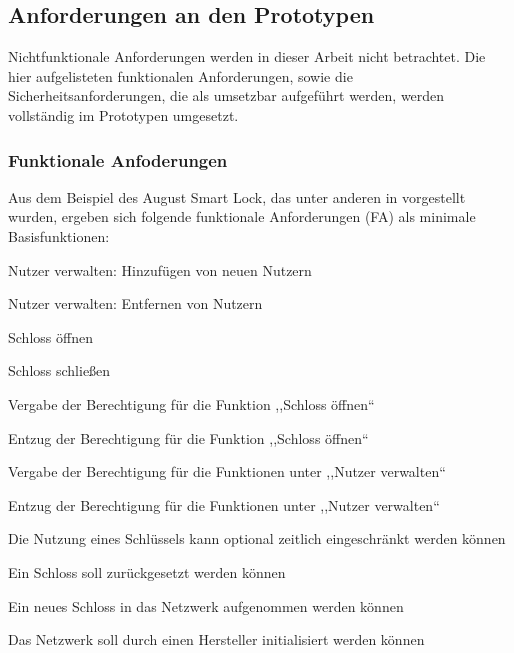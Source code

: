 \subsection{Anforderungen an den Prototypen}
\label{sec:prototype_requirements}
    Nichtfunktionale Anforderungen werden in dieser Arbeit nicht betrachtet. 
    Die hier aufgelisteten funktionalen Anforderungen, sowie die Sicherheitsanforderungen, die als umsetzbar aufgeführt werden, werden vollständig im Prototypen umgesetzt. 
    
\subsubsection{Funktionale Anfoderungen}
\label{sec:prototype_func_req}
    Aus dem Beispiel des August Smart Lock, das unter anderen in  vorgestellt wurden, ergeben sich folgende funktionale Anforderungen (FA) als minimale Basisfunktionen:
    \begin{FA}[noitemsep]
        \item \label{fa:1}Nutzer verwalten: Hinzufügen von neuen Nutzern
        \item \label{fa:2}Nutzer verwalten: Entfernen von Nutzern
        \item \label{fa:3}Schloss öffnen
        \item \label{fa:4}Schloss schließen
        \item \label{fa:5}Vergabe der Berechtigung für die Funktion ,,Schloss öffnen``
        \item \label{fa:6}Entzug der Berechtigung für die Funktion ,,Schloss öffnen``
        \item \label{fa:7}Vergabe der Berechtigung für die Funktionen unter ,,Nutzer verwalten``
        \item \label{fa:8}Entzug der Berechtigung für die Funktionen unter ,,Nutzer verwalten``
        \item \label{fa:9}Die Nutzung eines Schlüssels kann optional zeitlich eingeschränkt werden können
        \item \label{fa:10}Ein Schloss soll zurückgesetzt werden können
        \item \label{fa:11}Ein neues Schloss in das Netzwerk aufgenommen werden können
        \item \label{fa:12}Das Netzwerk soll durch einen Hersteller initialisiert werden können
    \end{FA}


